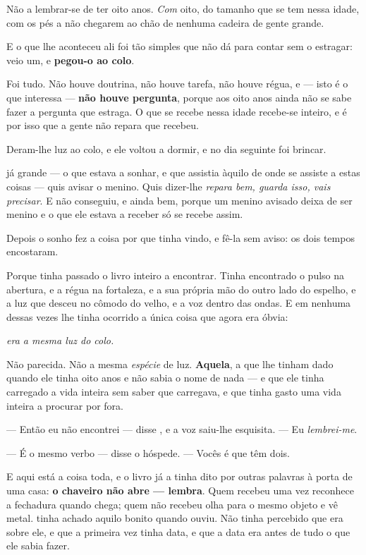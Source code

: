 \documentclass[livro.tex]{subfiles}
\begin{document}
Não a lembrar-se de ter oito anos. \emph{Com} oito, do tamanho que se tem
nessa idade, com os pés a não chegarem ao chão de nenhuma cadeira de gente
grande.

\medskip
\noindent E o que lhe aconteceu ali foi tão simples que não dá para contar sem
o estragar: veio um, e \textbf{pegou-o ao colo}.

\medskip
\noindent Foi tudo. Não houve doutrina, não houve tarefa, não houve régua, e ---
isto é o que interessa --- \textbf{não houve pergunta}, porque aos oito anos
ainda não se sabe fazer a pergunta que estraga. O que se recebe nessa idade
recebe-se inteiro, e é por isso que a gente não repara que recebeu.

\medskip
\noindent Deram-lhe luz ao colo, e ele voltou a dormir, e no dia seguinte foi
brincar.

\medskip
\noindent \Ben já grande --- o que estava a sonhar, e que assistia àquilo de
onde se assiste a estas coisas --- quis avisar o menino. Quis dizer-lhe
\emph{repara bem, guarda isso, vais precisar}. E não conseguiu, e ainda bem,
porque um menino avisado deixa de ser menino e o que ele estava a receber só se
recebe assim.

\medskip
\noindent Depois o sonho fez a coisa por que tinha vindo, e fê-la sem aviso: os
dois tempos encostaram.

\medskip
\noindent Porque \Ben tinha passado o livro inteiro a encontrar. Tinha
encontrado o pulso na abertura, e a régua na fortaleza, e a sua própria mão do
outro lado do espelho, e a luz que desceu no cômodo do velho, e a voz dentro das
ondas. E em nenhuma dessas vezes lhe tinha ocorrido a única coisa que agora era
óbvia:

\begin{center}
\emph{era a mesma luz do colo.}
\end{center}

\medskip
\noindent Não parecida. Não a mesma \emph{espécie} de luz. \textbf{Aquela}, a
que lhe tinham dado quando ele tinha oito anos e não sabia o nome de nada ---
e que ele tinha carregado a vida inteira sem saber que carregava, e que tinha
gasto uma vida inteira a procurar por fora.

\medskip
\noindent --- Então eu não encontrei --- disse \Ben , e a voz saiu-lhe
esquisita. --- Eu \emph{lembrei-me}.

--- É o mesmo verbo --- disse o hóspede. --- Vocês é que têm dois.

\medskip
\noindent E aqui está a coisa toda, e o livro já a tinha dito por outras
palavras à porta de uma casa: \textbf{o chaveiro não abre --- lembra}. Quem
recebeu uma vez reconhece a fechadura quando chega; quem não recebeu olha para
o mesmo objeto e vê metal. \Ben tinha achado aquilo bonito quando ouviu. Não
tinha percebido que era sobre ele, e que a primeira vez tinha data, e que a data
era antes de tudo o que ele sabia fazer.
\end{document}
